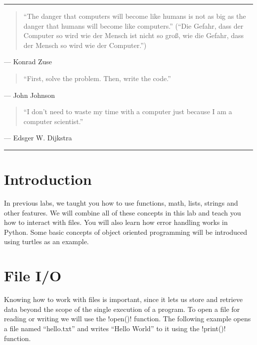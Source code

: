 \documentclass[11pt]{cselabheader}
\title{\thetitle}
\author{\theauthor}
\date{NMT Department of Computer Science and Engineering}
\begin{document}
\maketitle
\hrule

\begin{quotation}
``The danger that computers will become like humans is not as big as the danger
that humans will become like computers.'' (``Die Gefahr, dass der Computer so
wird wie der Mensch ist nicht so gro\ss, wie die Gefahr, dass der Mensch so wird
wie der Computer.'')
\end{quotation}
\begin{flushright}
--- Konrad Zuse
\end{flushright}

\begin{quotation}
``First, solve the problem. Then, write the code.''
\end{quotation}
\begin{flushright}
--- John Johnson
\end{flushright}

\begin{quotation}
``I don’t need to waste my time with a computer just because I am a computer
scientist.''
\end{quotation}
\begin{flushright}
--- Edsger W. Dijkstra
\end{flushright}

\hrule

\newpage
\section*{Introduction}

In previous labs, we taught you how to use functions, math, lists, strings and
other features. We will combine all of these concepts in this lab and teach you
how to interact with files. You will also learn how error handling works in
Python. Some basic concepts of object oriented programming will be introduced
using turtles as an example.

\tableofcontents

\newpage
{}
\section{File I/O}
Knowing how to work with files is important, since it lets us store and retrieve
data beyond the scope of the single execution of a program. To open a file for
reading or writing we will use the \pythoninline!open()! function. The
following example opens a file named ``hello.txt'' and writes ``Hello World''
to it using the \pythoninline!print()! function.
\end{document}
